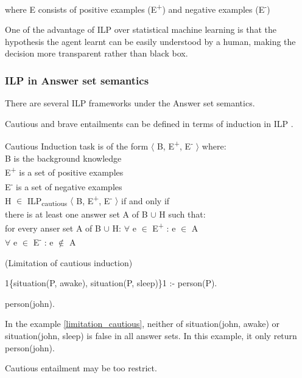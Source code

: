 \documentclass[12pt,twoside]{report}
\begin{document}
where E consists of positive examples (E\textsuperscript{+}) and negative examples (E\textsuperscript{-})


One of the advantage of ILP over statistical machine learning is that the hypothesis the agent learnt can be easily understood by a human, making the decision more transparent rather than black box.

\subsubsection{ILP in Answer set semantics}

There are several ILP frameworks under the Answer set semantics.

Cautious and brave entailments can be defined in terms of induction in ILP \cite{Sakama2009}.


Cautious Induction task is of the form $\langle$ B, E\textsuperscript{+}, E\textsuperscript{-} $\rangle$ where: \\
B is the background knowledge \\
E\textsuperscript{+} is a set of positive examples \\
E\textsuperscript{-} is a set of negative examples \\

 H $\in$ ILP\textsubscript{cautious} $\langle$ B, E\textsuperscript{+}, E\textsuperscript{-} $\rangle$ if and only if  \\

 there is at least one answer set A of B $\cup$ H such that: \\
 for every anser set A of B $\cup$ H:
$\forall$ e $\in$ E\textsuperscript{+} : e $\in$ A \\
$\forall$ e $\in$ E\textsuperscript{-} : e $\notin$ A \\

\begin{examp} (Limitation of cautious induction)

1\{situation(P, awake), situation(P, sleep)\}1 :- person(P).

person(john).
\end{examp}
\label{limitation_cautious}

In the example \ref{limitation_cautious}, neither of situation(john, awake) or situation(john, sleep) is false in all answer sets. In this example, it only return person(john).

Cautious entailment may be too restrict.
\end{document}

